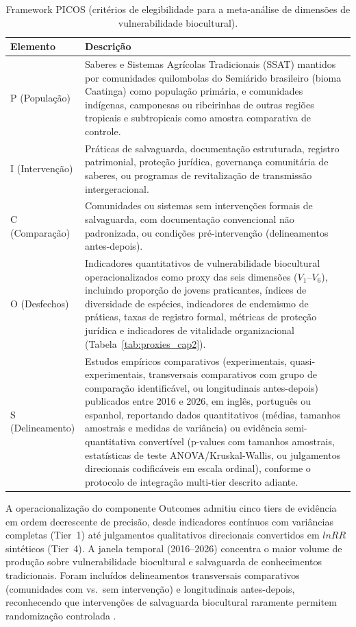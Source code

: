 \begin{table}[htbp]
\caption{Framework PICOS (critérios de elegibilidade para a meta-análise de dimensões de vulnerabilidade biocultural).}
\label{tab:picos_cap2}
\centering
\small
\begin{tabular}{p{2.5cm}p{10.5cm}}
\toprule
\textbf{Elemento} & \textbf{Descrição} \\
\midrule
P (População) & Saberes e Sistemas Agrícolas Tradicionais (SSAT) mantidos por comunidades quilombolas do Semiárido brasileiro (bioma Caatinga) como população primária, e comunidades indígenas, camponesas ou ribeirinhas de outras regiões tropicais e subtropicais como amostra comparativa de controle. \\
I (Intervenção) & Práticas de salvaguarda, documentação estruturada, registro patrimonial, proteção jurídica, governança comunitária de saberes, ou programas de revitalização de transmissão intergeracional. \\
C (Comparação) & Comunidades ou sistemas sem intervenções formais de salvaguarda, com documentação convencional não padronizada, ou condições pré-intervenção (delineamentos antes-depois). \\
O (Desfechos) & Indicadores quantitativos de vulnerabilidade biocultural operacionalizados como proxy das seis dimensões ($V_1$--$V_6$), incluindo proporção de jovens praticantes, índices de diversidade de espécies, indicadores de endemismo de práticas, taxas de registro formal, métricas de proteção jurídica e indicadores de vitalidade organizacional (Tabela~\ref{tab:proxies_cap2}). \\
S (Delineamento) & Estudos empíricos comparativos (experimentais, quasi-experimentais, transversais comparativos com grupo de comparação identificável, ou longitudinais antes-depois) publicados entre 2016 e 2026, em inglês, português ou espanhol, reportando dados quantitativos (médias, tamanhos amostrais e medidas de variância) ou evidência semi-quantitativa convertível (p-values com tamanhos amostrais, estatísticas de teste ANOVA/Kruskal-Wallis, ou julgamentos direcionais codificáveis em escala ordinal), conforme o protocolo de integração multi-tier descrito adiante. \\
\bottomrule
\end{tabular}
\end{table}

A operacionalização do componente Outcomes admitiu cinco tiers de evidência em ordem decrescente de precisão, desde indicadores contínuos com variâncias completas (Tier~1) até julgamentos qualitativos direcionais convertidos em $lnRR$ sintéticos (Tier~4). A janela temporal (2016--2026) concentra o maior volume de produção sobre vulnerabilidade biocultural e salvaguarda de conhecimentos tradicionais. Foram incluídos delineamentos transversais comparativos (comunidades com vs.\ sem intervenção) e longitudinais antes-depois, reconhecendo que intervenções de salvaguarda biocultural raramente permitem randomização controlada \cite{Shadish2002}.

